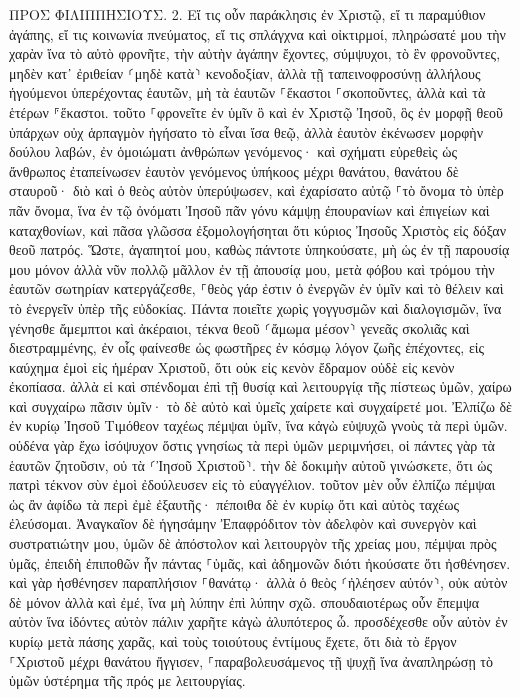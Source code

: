 \documentclass[twoside, 9pt]{extreport}
\begin{document}
ΠΡΟΣ ΦΙΛΙΠΠΗΣΙΟΥΣ.
2.
Εἴ τις οὖν παράκλησις ἐν Χριστῷ, εἴ τι παραμύθιον ἀγάπης, εἴ τις κοινωνία πνεύματος, εἴ τις σπλάγχνα καὶ οἰκτιρμοί, 
πληρώσατέ μου τὴν χαρὰν ἵνα τὸ αὐτὸ φρονῆτε, τὴν αὐτὴν ἀγάπην ἔχοντες, σύμψυχοι, τὸ ἓν φρονοῦντες, 
μηδὲν κατ᾽ ἐριθείαν ⸂μηδὲ κατὰ⸃ κενοδοξίαν, ἀλλὰ τῇ ταπεινοφροσύνῃ ἀλλήλους ἡγούμενοι ὑπερέχοντας ἑαυτῶν, 
μὴ τὰ ἑαυτῶν ⸀ἕκαστοι ⸀σκοποῦντες, ἀλλὰ καὶ τὰ ἑτέρων ⸁ἕκαστοι. 
τοῦτο ⸀φρονεῖτε ἐν ὑμῖν ὃ καὶ ἐν Χριστῷ Ἰησοῦ, 
ὃς ἐν μορφῇ θεοῦ ὑπάρχων οὐχ ἁρπαγμὸν ἡγήσατο τὸ εἶναι ἴσα θεῷ, 
ἀλλὰ ἑαυτὸν ἐκένωσεν μορφὴν δούλου λαβών, ἐν ὁμοιώματι ἀνθρώπων γενόμενος· καὶ σχήματι εὑρεθεὶς ὡς ἄνθρωπος 
ἐταπείνωσεν ἑαυτὸν γενόμενος ὑπήκοος μέχρι θανάτου, θανάτου δὲ σταυροῦ· 
διὸ καὶ ὁ θεὸς αὐτὸν ὑπερύψωσεν, καὶ ἐχαρίσατο αὐτῷ ⸀τὸ ὄνομα τὸ ὑπὲρ πᾶν ὄνομα, 
ἵνα ἐν τῷ ὀνόματι Ἰησοῦ πᾶν γόνυ κάμψῃ ἐπουρανίων καὶ ἐπιγείων καὶ καταχθονίων, 
καὶ πᾶσα γλῶσσα ἐξομολογήσηται ὅτι κύριος Ἰησοῦς Χριστὸς εἰς δόξαν θεοῦ πατρός. 
Ὥστε, ἀγαπητοί μου, καθὼς πάντοτε ὑπηκούσατε, μὴ ὡς ἐν τῇ παρουσίᾳ μου μόνον ἀλλὰ νῦν πολλῷ μᾶλλον ἐν τῇ ἀπουσίᾳ μου, μετὰ φόβου καὶ τρόμου τὴν ἑαυτῶν σωτηρίαν κατεργάζεσθε, 
⸀θεὸς γάρ ἐστιν ὁ ἐνεργῶν ἐν ὑμῖν καὶ τὸ θέλειν καὶ τὸ ἐνεργεῖν ὑπὲρ τῆς εὐδοκίας. 
Πάντα ποιεῖτε χωρὶς γογγυσμῶν καὶ διαλογισμῶν, 
ἵνα γένησθε ἄμεμπτοι καὶ ἀκέραιοι, τέκνα θεοῦ ⸂ἄμωμα μέσον⸃ γενεᾶς σκολιᾶς καὶ διεστραμμένης, ἐν οἷς φαίνεσθε ὡς φωστῆρες ἐν κόσμῳ 
λόγον ζωῆς ἐπέχοντες, εἰς καύχημα ἐμοὶ εἰς ἡμέραν Χριστοῦ, ὅτι οὐκ εἰς κενὸν ἔδραμον οὐδὲ εἰς κενὸν ἐκοπίασα. 
ἀλλὰ εἰ καὶ σπένδομαι ἐπὶ τῇ θυσίᾳ καὶ λειτουργίᾳ τῆς πίστεως ὑμῶν, χαίρω καὶ συγχαίρω πᾶσιν ὑμῖν· 
τὸ δὲ αὐτὸ καὶ ὑμεῖς χαίρετε καὶ συγχαίρετέ μοι. 
Ἐλπίζω δὲ ἐν κυρίῳ Ἰησοῦ Τιμόθεον ταχέως πέμψαι ὑμῖν, ἵνα κἀγὼ εὐψυχῶ γνοὺς τὰ περὶ ὑμῶν. 
οὐδένα γὰρ ἔχω ἰσόψυχον ὅστις γνησίως τὰ περὶ ὑμῶν μεριμνήσει, 
οἱ πάντες γὰρ τὰ ἑαυτῶν ζητοῦσιν, οὐ τὰ ⸂Ἰησοῦ Χριστοῦ⸃. 
τὴν δὲ δοκιμὴν αὐτοῦ γινώσκετε, ὅτι ὡς πατρὶ τέκνον σὺν ἐμοὶ ἐδούλευσεν εἰς τὸ εὐαγγέλιον. 
τοῦτον μὲν οὖν ἐλπίζω πέμψαι ὡς ἂν ἀφίδω τὰ περὶ ἐμὲ ἐξαυτῆς· 
πέποιθα δὲ ἐν κυρίῳ ὅτι καὶ αὐτὸς ταχέως ἐλεύσομαι. 
Ἀναγκαῖον δὲ ἡγησάμην Ἐπαφρόδιτον τὸν ἀδελφὸν καὶ συνεργὸν καὶ συστρατιώτην μου, ὑμῶν δὲ ἀπόστολον καὶ λειτουργὸν τῆς χρείας μου, πέμψαι πρὸς ὑμᾶς, 
ἐπειδὴ ἐπιποθῶν ἦν πάντας ⸀ὑμᾶς, καὶ ἀδημονῶν διότι ἠκούσατε ὅτι ἠσθένησεν. 
καὶ γὰρ ἠσθένησεν παραπλήσιον ⸀θανάτῳ· ἀλλὰ ὁ θεὸς ⸂ἠλέησεν αὐτόν⸃, οὐκ αὐτὸν δὲ μόνον ἀλλὰ καὶ ἐμέ, ἵνα μὴ λύπην ἐπὶ λύπην σχῶ. 
σπουδαιοτέρως οὖν ἔπεμψα αὐτὸν ἵνα ἰδόντες αὐτὸν πάλιν χαρῆτε κἀγὼ ἀλυπότερος ὦ. 
προσδέχεσθε οὖν αὐτὸν ἐν κυρίῳ μετὰ πάσης χαρᾶς, καὶ τοὺς τοιούτους ἐντίμους ἔχετε, 
ὅτι διὰ τὸ ἔργον ⸀Χριστοῦ μέχρι θανάτου ἤγγισεν, ⸀παραβολευσάμενος τῇ ψυχῇ ἵνα ἀναπληρώσῃ τὸ ὑμῶν ὑστέρημα τῆς πρός με λειτουργίας. 
\end{document}

